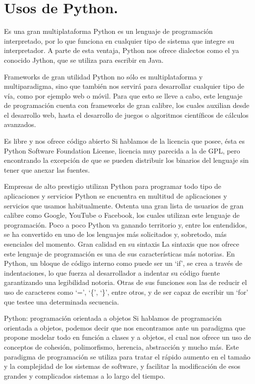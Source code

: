 \section{Usos de Python.}

Es una gran multiplataforma
Python es un lenguaje de programación interpretado, por lo que funciona en cualquier tipo de sistema que integre su interpretador.  A parte de esta ventaja, Python nos ofrece dialectos como el ya conocido Jython, que se utiliza para escribir en Java.
 
Frameworks de gran utilidad
Python no sólo es multiplataforma y multiparadigma, sino que también nos servirá para desarrollar cualquier tipo de vía, como por ejemplo web o móvil. Para que esto se lleve a cabo, este lenguaje de programación cuenta con frameworks de gran calibre, los cuales auxilian desde el desarrollo web, hasta el desarrollo de juegos o algoritmos científicos de cálculos avanzados.
 
Es libre y nos ofrece código abierto
Si hablamos de la licencia que posee, ésta es Python Software Foundation License, licencia muy parecida a la de GPL, pero encontrando la excepción de que se pueden distribuir los binarios del lenguaje sin tener que anexar las fuentes.
 
Empresas de alto prestigio utilizan Python para programar todo tipo de aplicaciones y servicios
Python se encuentra en multitud de aplicaciones y servicios que usamos habitualmente. Ostenta una gran lista de usuarios de gran calibre como Google, YouTube o Facebook, los cuales utilizan este lenguaje de programación. Poco a poco Python va ganando territorio y, entre los entendidos, se ha convertido en uno de los lenguajes más solicitados y, sobretodo, más esenciales del momento. 
Gran calidad en su sintaxis
La sintaxis que nos ofrece este lenguaje de programación es una de sus características más notorias. En Python, un bloque de código interno como puede ser un ‘if’, se crea a través de indentaciones, lo que fuerza al desarrollador a indentar su código fuente garantizando una legibilidad notoria.
Otras de sus funciones son las de reducir el uso de caracteres como ‘=’, ‘\{’, ‘\}’, entre otros, y de ser capaz de escribir un ‘for’ que testee una determinada secuencia.
 
Python: programación orientada a objetos
Si hablamos de programación orientada a objetos, podemos decir que nos encontramos ante un paradigma que propone modelar todo en función a clases y a objetos, el cual nos ofrece un uso de conceptos de cohesión, polimorfismo, herencia, abstracción y mucho más.
Este paradigma de programación se utiliza para tratar el rápido aumento en el tamaño y la complejidad de los sistemas de software, y facilitar la modificación de esos grandes y complicados sistemas a lo largo del tiempo.
 
